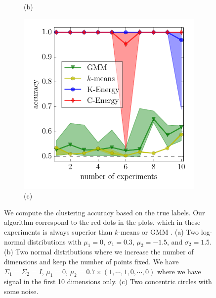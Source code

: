 \documentclass[simplex.tex]{subfiles}
\begin{document}
\begin{figure}[h!]
\begin{cframed}
\begin{subfigure}[t]{0.32\textwidth}
(b)
\end{subfigure}
\begin{subfigure}[t]{0.32\textwidth}
\centering
\includegraphics[width=\textwidth]{../../figs/circles.pdf}\\[-.5em]
(c)
\end{subfigure}
\caption{
\label{fig:nonpar}
We compute the clustering accuracy based on the true labels.
Our algorithm correspond to the red dots in the plots, which in these
experiments is always superior than $k$-means or GMM .
(a) Two log-normal distributions with $\mu_1=0$, $\sigma_1=0.3$, $\mu_2=-1.5$,
and $\sigma_2=1.5$. 
(b) Two normal distributions where we increase
the number of dimensions and keep the number of points fixed. We have
$\Sigma_1 = \Sigma_2 = I$, $\mu_1=0$, $\mu_2=0.7\times(1,\cdots,1,0,\cdots,0)$
where we have signal in the first 10 dimensions only.
(c) Two concentric circles
with some noise. 
}
\end{cframed}
\end{figure}
\end{document}
